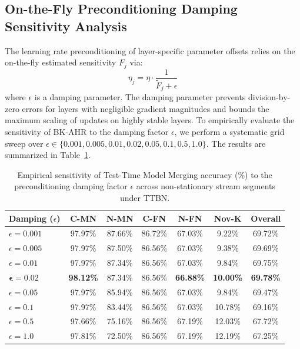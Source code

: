 \documentclass{article}
\theoremstyle{plain}
\theoremstyle{definition}
\theoremstyle{remark}
\begin{document}
\subsection{On-the-Fly Preconditioning Damping Sensitivity Analysis}
\label{subsec:damping_sensitivity}

The learning rate preconditioning of layer-specific parameter offsets relies on the on-the-fly estimated sensitivity $F_j$ via:
\begin{equation}
  \eta_j = \eta \cdot \frac{1}{\tilde{F}_j + \epsilon}
\end{equation}
where $\epsilon$ is a damping parameter. The damping parameter prevents division-by-zero errors for layers with negligible gradient magnitudes and bounds the maximum scaling of updates on highly stable layers. To empirically evaluate the sensitivity of BK-AHR to the damping factor $\epsilon$, we perform a systematic grid sweep over $\epsilon \in \{0.001, 0.005, 0.01, 0.02, 0.05, 0.1, 0.5, 1.0\}$. The results are summarized in Table~\ref{tab:damping}.

\begin{table}[htbp]
  \caption{Empirical sensitivity of Test-Time Model Merging accuracy (\%) to the preconditioning damping factor $\epsilon$ across non-stationary stream segments under TTBN.}
  \label{tab:damping}
  \vskip 0.15in
  \begin{center}
    \begin{small}
      \begin{tabular}{lcccccc}
        \toprule
        Damping ($\epsilon$) & C-MN & N-MN & C-FN & N-FN & Nov-K & Overall \\
        \midrule
        $\epsilon = 0.001$ & 97.97\% & 87.66\% & 86.72\% & 67.03\% & 9.22\% & 69.72\% \\
        $\epsilon = 0.005$ & 97.97\% & 87.50\% & 86.56\% & 67.03\% & 9.38\% & 69.69\% \\
        $\epsilon = 0.01$  & 97.97\% & 87.34\% & 86.56\% & 67.03\% & 9.84\% & 69.75\% \\
        $\mathbf{\epsilon = 0.02}$ & \textbf{98.12\%} & 87.34\% & 86.56\% & \textbf{66.88\%} & \textbf{10.00\%} & \textbf{69.78\%} \\
        $\epsilon = 0.05$  & 97.97\% & 85.94\% & 86.56\% & 67.03\% & 9.84\% & 69.47\% \\
        $\epsilon = 0.1$   & 97.97\% & 83.44\% & 86.56\% & 67.03\% & 10.78\% & 69.16\% \\
        $\epsilon = 0.5$   & 97.66\% & 75.16\% & 86.56\% & 67.19\% & 12.03\% & 67.72\% \\
        $\epsilon = 1.0$   & 97.81\% & 72.50\% & 86.56\% & 67.19\% & 12.19\% & 67.25\% \\
        \bottomrule
      \end{tabular}
    \end{small}
  \end{center}
  \vskip -0.1in
\end{table}
\end{document}
